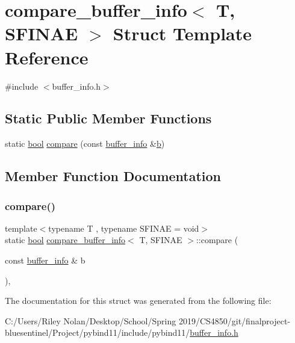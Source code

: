 \hypertarget{structcompare__buffer__info}{}\section{compare\+\_\+buffer\+\_\+info$<$ T, S\+F\+I\+N\+AE $>$ Struct Template Reference}
\label{structcompare__buffer__info}


{\ttfamily \#include $<$buffer\+\_\+info.\+h$>$}

\subsection*{Static Public Member Functions}
\begin{DoxyCompactItemize}
\item 
static \mbox{\hyperlink{asdl_8h_af6a258d8f3ee5206d682d799316314b1}{bool}} \mbox{\hyperlink{structcompare__buffer__info_a3227161502cf6f643bdb0f99963909bc}{compare}} (const \mbox{\hyperlink{structbuffer__info}{buffer\+\_\+info}} \&\mbox{\hyperlink{_s_d_l__opengl__glext_8h_a0f71581a41fd2264c8944126dabbd010}{b}})
\end{DoxyCompactItemize}


\subsection{Member Function Documentation}
\mbox{\label{structcompare__buffer__info_a3227161502cf6f643bdb0f99963909bc}} 
\subsubsection{\texorpdfstring{compare()}{compare()}}
{\footnotesize\ttfamily template$<$typename T , typename S\+F\+I\+N\+AE  = void$>$ \\
static \mbox{\hyperlink{asdl_8h_af6a258d8f3ee5206d682d799316314b1}{bool}} \mbox{\hyperlink{structcompare__buffer__info}{compare\+\_\+buffer\+\_\+info}}$<$ T, S\+F\+I\+N\+AE $>$\+::compare (\begin{DoxyParamCaption}\item[{const \mbox{\hyperlink{structbuffer__info}{buffer\+\_\+info}} \&}]{b }\end{DoxyParamCaption})\hspace{0.3cm}{\ttfamily [inline]}, {\ttfamily [static]}}



The documentation for this struct was generated from the following file\+:\begin{DoxyCompactItemize}
\item 
C\+:/\+Users/\+Riley Nolan/\+Desktop/\+School/\+Spring 2019/\+C\+S4850/git/finalproject-\/bluesentinel/\+Project/pybind11/include/pybind11/\mbox{\hyperlink{buffer__info_8h}{buffer\+\_\+info.\+h}}\end{DoxyCompactItemize}
